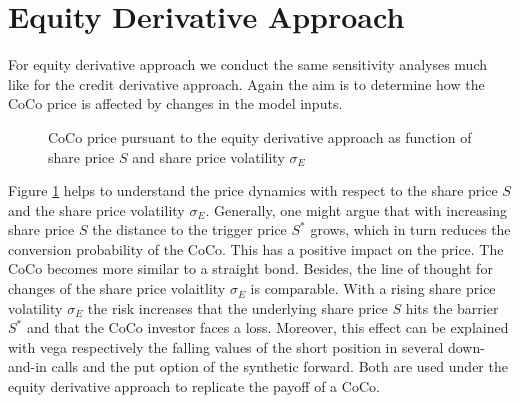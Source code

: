 \section{Equity Derivative Approach}\label{sensiequity}

For equity derivative approach we conduct the same sensitivity analyses much like for the credit derivative approach. Again the aim is to determine how the CoCo price is affected by changes in the model inputs. 

\begin{figure}[H]
\centering
    \caption[CoCo price pursuant to the equity derivative approach as function of share price and share price volatility]{CoCo price pursuant to the equity derivative approach as function of share price $S$ and share price volatility $\sigma_E$}
  \label{fig:ed1}
  \end{figure}
  
Figure \ref{fig:ed1} helps to understand the price dynamics with respect to the share price $S$ and the share price volatility $\sigma_E$. Generally, one might argue that with increasing share price $S$ the distance to the trigger price $S^*$ grows, which in turn reduces the conversion probability of the CoCo. This has a positive impact on the price. The CoCo becomes more similar to a straight bond. Besides, the line of thought for changes of the share price volaitlity $\sigma_E$ is comparable. With a rising share price volatility $\sigma_E$ the risk increases that the underlying share price $S$ hits the barrier $S^*$ and that the CoCo investor faces a loss. Moreover, this effect can be explained with vega respectively the falling values of the short position in several down-and-in calls and the put option of the synthetic forward. Both are used under the equity derivative approach to replicate the payoff of a CoCo.

